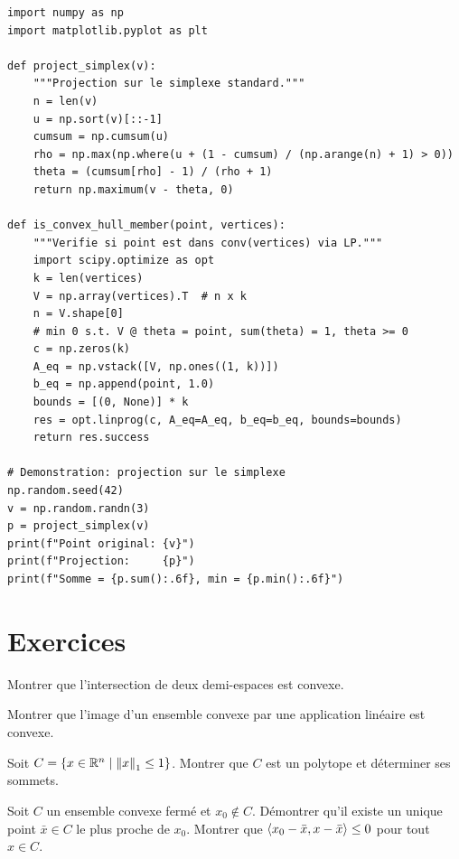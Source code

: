 \begin{codeblock}[title=\textbf{Projection sur le simplexe et v\'erification de convexit\'e}]
\begin{verbatim}
import numpy as np
import matplotlib.pyplot as plt

def project_simplex(v):
    """Projection sur le simplexe standard."""
    n = len(v)
    u = np.sort(v)[::-1]
    cumsum = np.cumsum(u)
    rho = np.max(np.where(u + (1 - cumsum) / (np.arange(n) + 1) > 0))
    theta = (cumsum[rho] - 1) / (rho + 1)
    return np.maximum(v - theta, 0)

def is_convex_hull_member(point, vertices):
    """Verifie si point est dans conv(vertices) via LP."""
    import scipy.optimize as opt
    k = len(vertices)
    V = np.array(vertices).T  # n x k
    n = V.shape[0]
    # min 0 s.t. V @ theta = point, sum(theta) = 1, theta >= 0
    c = np.zeros(k)
    A_eq = np.vstack([V, np.ones((1, k))])
    b_eq = np.append(point, 1.0)
    bounds = [(0, None)] * k
    res = opt.linprog(c, A_eq=A_eq, b_eq=b_eq, bounds=bounds)
    return res.success

# Demonstration: projection sur le simplexe
np.random.seed(42)
v = np.random.randn(3)
p = project_simplex(v)
print(f"Point original: {v}")
print(f"Projection:     {p}")
print(f"Somme = {p.sum():.6f}, min = {p.min():.6f}")
\end{verbatim}
\end{codeblock}

\section{Exercices}

\begin{exercice}[$\star$]
Montrer que l'intersection de deux demi-espaces est convexe.
\end{exercice}

\begin{exercice}[$\star$]
Montrer que l'image d'un ensemble convexe par une application lin\'eaire est convexe.
\end{exercice}

\begin{exercice}[$\star\star$]
Soit $C = \{x \in \mathbb{R}^n \mid \left\| x \right\|_1 \leq 1\}$. Montrer que $C$ est un polytope
et d\'eterminer ses sommets.
\end{exercice}

\begin{exercice}[$\star\star$]
Soit $C$ un ensemble convexe ferm\'e et $x_0 \notin C$. D\'emontrer qu'il existe
un unique point $\bar{x} \in C$ le plus proche de $x_0$. Montrer que
$\langle x_0 - \bar{x}, x - \bar{x} \rangle \leq 0$ pour tout $x \in C$.
\end{exercice}

